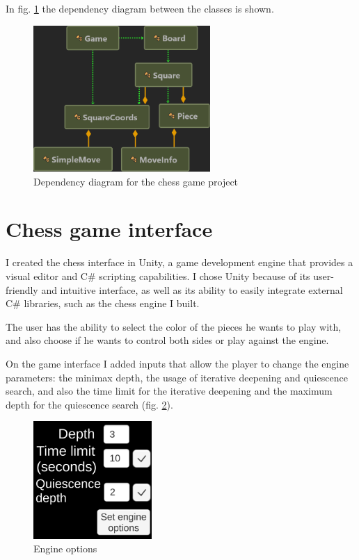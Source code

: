 In fig. \ref{fig:depDiagram} the dependency diagram between the classes is shown.

\begin{figure}[h]
    \centering
    \includegraphics[width=0.6\textwidth]{figures/dependency-diagram-chess-game.png}
    \caption{Dependency diagram for the chess game project}
    \label{fig:depDiagram}
\end{figure}

\section{Chess game interface}
\label{sec:ch5sec2}

I created the chess interface in Unity, a game development engine that provides a visual editor and C\# scripting capabilities. I chose Unity because of its user-friendly and intuitive interface, as well as its ability to easily integrate external C\# libraries, such as the chess engine I built.

The user has the ability to select the color of the pieces he wants to play with, and also choose if he wants to control both sides or play against the engine.

On the game interface I added inputs that allow the player to change the engine parameters: the minimax depth, the usage of iterative deepening and quiescence search, and also the time limit for the iterative deepening and the maximum depth for the quiescence search (fig. \ref{fig:engineOptions}).

\begin{figure}[h]
    \centering
    \includegraphics[width=0.4\textwidth]{figures/chess-game-engine-options.png}
    \caption{Engine options}
    \label{fig:engineOptions}
\end{figure}


